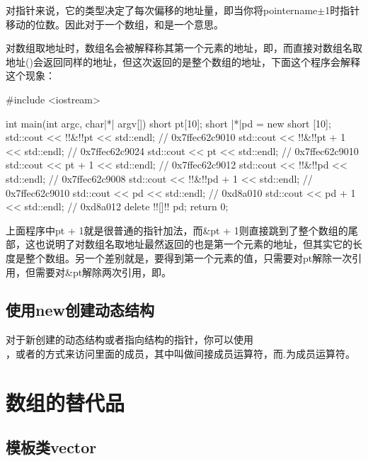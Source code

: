 对指针来说，它的类型决定了每次偏移的地址量，即当你将pointername$\pm$1时指针移动的位数。因此对于一个数组，和是一个意思。

对数组取地址时，数组名会被解释称其第一个元素的地址，即，而直接对数组名取地址()会返回同样的地址，但这次返回的是整个数组的地址，下面这个程序会解释这个现象：

\begin{cpp}
#include <iostream>

int main(int argc, char|*| argv[]) {
    short pt[10];
    short |*|pd = new short [10];
    std::cout << !!&!!pt << std::endl; // 0x7ffec62c9010
    std::cout << !!&!!pt + 1 << std::endl; // 0x7ffec62c9024
    std::cout << pt << std::endl; // 0x7ffec62c9010
    std::cout << pt + 1 << std::endl; // 0x7ffec62c9012
    std::cout << !!&!!pd << std::endl; // 0x7ffec62c9008
    std::cout << !!&!!pd + 1 << std::endl; // 0x7ffec62c9010
    std::cout << pd << std::endl; // 0xd8a010
    std::cout << pd + 1 << std::endl; // 0xd8a012
    delete !![]!! pd;
    return 0;
}
\end{cpp}

上面程序中pt + 1就是很普通的指针加法，而\&pt + 1则直接跳到了整个数组的尾部，这也说明了对数组名取地址最然返回的也是第一个元素的地址，但其实它的长度是整个数组。另一个差别就是，要得到第一个元素的值，只需要对pt解除一次引用，但需要对\&pt解除两次引用，即。

\addtocounter{subsection}{1}

\subsection{使用new创建动态结构}

对于新创建的动态结构或者指向结构的指针，你可以使用\\ ，或者的方式来访问里面的成员，其中\fira{->}叫做间接成员运算符，而.为成员运算符。

\addtocounter{section}{1}

\section{数组的替代品}

\subsection{模板类vector}

